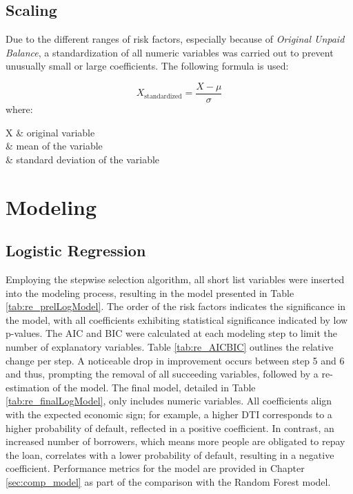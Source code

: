 \subsection{Scaling}
Due to the different ranges of risk factors, especially because of \emph{Original Unpaid Balance}, a standardization of all numeric variables was carried out to prevent unusually small or large coefficients. The following formula is used:

\begin{equation}
X_{\text{standardized}} = \frac{X - \mu}{\sigma}
\end{equation}
where:
\begin{conditions}
 X  	& original variable \\
\mu		& mean of the variable \\
\sigma	& standard deviation of the variable
\end{conditions}

\section{Modeling}

\subsection{Logistic Regression}
Employing the stepwise selection algorithm, all short list variables were inserted into the modeling process, resulting in the model presented in Table \ref{tab:re_prelLogModel}. The order of the risk factors indicates the significance in the model, with all coefficients exhibiting statistical significance indicated by low p-values. The AIC and BIC were calculated at each modeling step to limit the number of explanatory variables. Table \ref{tab:re_AICBIC} outlines the relative change per step. A noticeable drop in improvement occurs between step 5 and 6 and thus, prompting the removal of all succeeding variables, followed by a re-estimation of the model. The final model, detailed in Table \ref{tab:re_finalLogModel}, only includes numeric variables. All coefficients align with the expected economic sign; for example, a higher DTI corresponds to a higher probability of default, reflected in a positive coefficient. In contrast, an increased number of borrowers, which means more people are obligated to repay the loan, correlates with a lower probability of default, resulting in a negative coefficient. Performance metrics for the model are provided in Chapter \ref{sec:comp_model} as part of the comparison with the Random Forest model.

